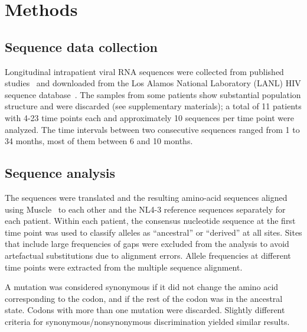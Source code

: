 \documentclass[rmp, twocolumn]{revtex4}
\begin{document}
\section{Methods}
\subsection{Sequence data collection}
Longitudinal intrapatient viral RNA sequences were collected from published
studies~\citep{shankarappa_consistent_1999, liu_selection_2006,
bunnik_autologous_2008} and downloaded from the Los Alamos National Laboratory
(LANL) HIV sequence database~\citep{LANL2012}. The samples from some patients
show substantial population structure and were discarded (see supplementary
materials); a total of 11 patients with 4-23 time points each and approximately 10
sequences per time point were analyzed. The time intervals between two
consecutive sequences ranged from 1 to 34 months, most of them between 6 and 10
months.

\subsection{Sequence analysis}
The sequences were translated and the resulting amino-acid sequences aligned
using Muscle~\citep{edgar_muscle:_2004} to each other and the NL4-3 reference
sequences separately for each patient. Within each patient, the consensus
nucleotide sequence at the first time point was used to classify alleles as
``ancestral'' or ``derived'' at all sites. Sites that include large
frequencies of gaps were excluded from the analysis to avoid artefactual
substitutions due to alignment errors. Allele frequencies at different time
points were extracted from the multiple sequence alignment.

A mutation was considered synonymous if it did not change the amino acid
corresponding to the codon, and if the rest of the codon was in the ancestral
state. Codons with more than one mutation were discarded. Slightly different
criteria for synonymous/nonsynonymous discrimination yielded similar results.

\end{document}
